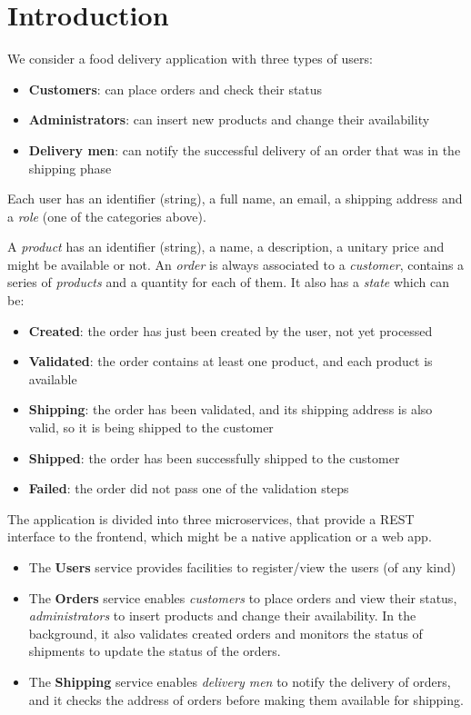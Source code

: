 \section{Introduction}
\label{sec:intro}

We consider a food delivery application with three types of users:
\begin{itemize}[noitemsep]
    \item \textbf{Customers}: can place orders and check their status 
    \item \textbf{Administrators}: can insert new products and change their availability
    \item \textbf{Delivery men}: can notify the successful delivery of an order that was in the shipping phase 
\end{itemize}
Each user has an identifier (string), a full name, an email, a shipping address and a \emph{role} (one of the categories above).

A \emph{product} has an identifier (string), a name, a description, a unitary price and might be available or not.
An \emph{order} is always associated to a \emph{customer}, contains a series of \emph{products} and a quantity for each of them.
It also has a \emph{state} which can be:
\begin{itemize}[noitemsep]
    \item \textbf{Created}: the order has just been created by the user, not yet processed 
    \item \textbf{Validated}: the order contains at least one product, and each product is available 
    \item \textbf{Shipping}: the order has been validated, and its shipping address is also valid, so it is being shipped to the customer
    \item \textbf{Shipped}: the order has been successfully shipped to the customer
    \item \textbf{Failed}: the order did not pass one of the validation steps
\end{itemize}

The application is divided into three microservices, that provide a REST interface to the frontend, which might be a native application or a web app.
\begin{itemize}
    \item The \textbf{Users} service provides facilities to register/view the users (of any kind) 
    \item The \textbf{Orders} service enables \emph{customers} to place orders and view their status, \emph{administrators} to insert products and change their availability.
    In the background, it also validates created orders and monitors the status of shipments to update the status of the orders.
    \item The \textbf{Shipping} service enables \emph{delivery men} to notify the delivery of orders, and it checks the address of orders before making them available for shipping.
\end{itemize}

